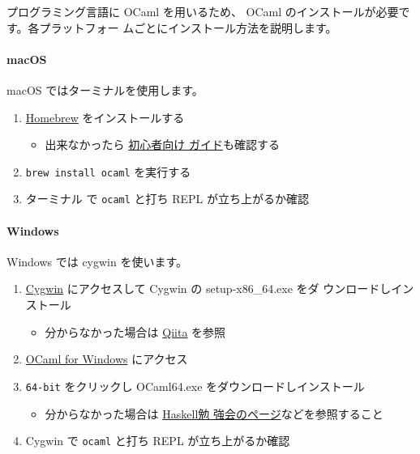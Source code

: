 \documentclass[a4paper,11pt]{jsarticle}
\begin{document}
プログラミング言語に OCaml を用いるため、 OCaml のインストールが必要です。各プラットフォー
ムごとにインストール方法を説明します。

\paragraph{macOS}

macOS ではターミナルを使用します。

\begin{enumerate}
\item \href{https://brew.sh/ja}{Homebrew} をインストールする
  \begin{itemize}
  \item 出来なかったら \href{https://zenn.dev/inablog/articles/5e790c9fbdad20}{初心者向け
      ガイド}も確認する
  \end{itemize}
\item \verb|brew install ocaml| を実行する
\item ターミナル で \verb|ocaml| と打ち REPL が立ち上がるか確認
\end{enumerate}

\paragraph{Windows}

Windows では cygwin を使います。

\begin{enumerate}

\item \href{https://cygwin.com/}{Cygwin} にアクセスして Cygwin の setup-x86\_64.exe をダ
  ウンロードしインストール
  \begin{itemize}
  \item 分からなかった場合は
    \href{https://qiita.com/nouernet/items/271a285db517e4a25817}{Qiita} を参照
  \end{itemize}
\item \href{https://fdopen.github.io/opam-repository-mingw/installation/}{OCaml for
    Windows} にアクセス
\item \verb|64-bit| をクリックし OCaml64.exe をダウンロードしインストール
  \begin{itemize}
  \item 分からなかった場合は
    \href{https://haskell.hatenablog.com/entry/How-to-install-OCaml-on-Windows}{Haskell勉
      強会のページ}などを参照すること
  \end{itemize}
\item Cygwin で \verb|ocaml| と打ち REPL が立ち上がるか確認
\end{enumerate}
\end{document}

